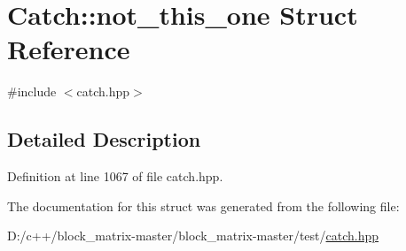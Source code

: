 \hypertarget{struct_catch_1_1not__this__one}{}\section{Catch\+:\+:not\+\_\+this\+\_\+one Struct Reference}
\label{struct_catch_1_1not__this__one}


{\ttfamily \#include $<$catch.\+hpp$>$}



\subsection{Detailed Description}


Definition at line 1067 of file catch.\+hpp.



The documentation for this struct was generated from the following file\+:\begin{DoxyCompactItemize}
\item 
D\+:/c++/block\+\_\+matrix-\/master/block\+\_\+matrix-\/master/test/\mbox{\hyperlink{catch_8hpp}{catch.\+hpp}}\end{DoxyCompactItemize}

